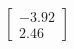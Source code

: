 \documentclass[preview]{standalone}
\begin{document}
\begin{align*}
\begin{bmatrix} -3.92 \\ 2.46 \end{bmatrix}
\end{align*}
\end{document}
